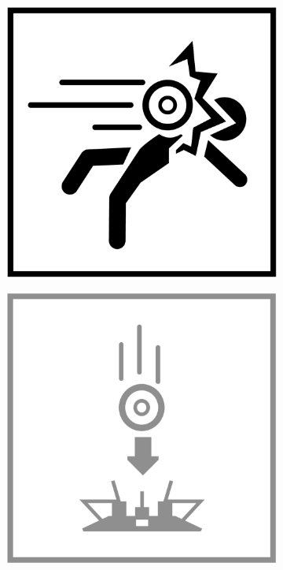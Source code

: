 \begin{figure}[H]
\begin{subfigure}[l]{0.195\linewidth}
  \end{subfigure}
  \begin{subfigure}[l]{0.195\linewidth}
    \includegraphics[width=\textwidth]{Sources/PortalIcons/3.jpg}
  \end{subfigure}
  \begin{subfigure}[l]{0.195\linewidth}
    \includegraphics[width=\textwidth]{Sources/PortalIcons/d4.jpg}

\end{subfigure}
\end{figure}
